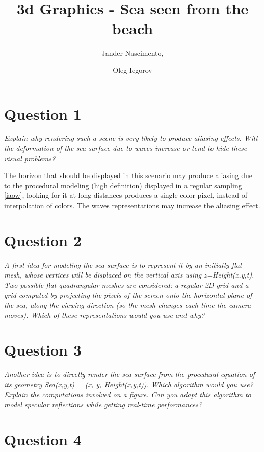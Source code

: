 \documentclass{report}
\begin{document}
\title{3d Graphics - Sea seen from the beach}

\author{Jander Nascimento, 
\and Oleg Iegorov}

\maketitle

\section{Question 1}

\emph{Explain why rendering such a scene is very likely to produce aliasing effects. Will the
deformation of the sea surface due to waves increase or tend to hide these visual problems?}

The horizon that should be displayed in this scenario may produce aliasing due to the procedural modeling (high definition) displayed in a regular sampling \ref{iaow}, looking for it at long distances produces a single color pixel, instead of interpolation of colors. The waves representations may increase the aliasing effect.

\section{Question 2}

\emph{A first idea for modeling the sea surface is to represent it by an initially flat mesh, whose
vertices will be displaced on the vertical axis using z=Height(x,y,t). Two possible flat
quadrangular meshes are considered: a regular 2D grid and a grid computed by projecting the
pixels of the screen onto the horizontal plane of the sea, along the viewing direction (so the
mesh changes each time the camera moves). Which of these representations would you use
and why?}

\section{Question 3}

\emph{Another idea is to directly render the sea surface from the procedural equation of its
geometry Sea(x,y,t) = (x, y, Height(x,y,t)). Which algorithm would you use? Explain the
computations involved on a figure. Can you adapt this algorithm to model specular
reflections while getting real-time performances?}

\section{Question 4}
\end{document}
